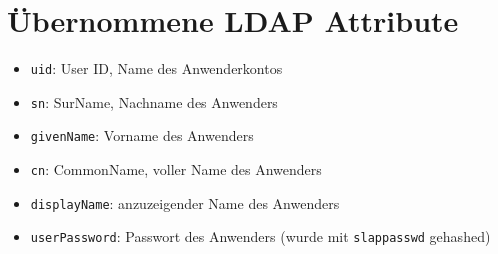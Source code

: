 \documentclass[11pt,a4paper,titlepage=firstiscover,headsepline,bibtotoc]{scrartcl} %
\begin{document}
%
%



\appendix
\newpage
{} %
\section{Übernommene LDAP Attribute} \label{sec:LDAP-Attribute}
\begin{itemize}
\item\texttt{uid}: User ID, Name des Anwenderkontos
\item\texttt{sn}: SurName, Nachname des Anwenders
\item\texttt{givenName}: Vorname des Anwenders
\item\texttt{cn}: CommonName, voller Name des Anwenders
\item\texttt{displayName}: anzuzeigender Name des Anwenders
\item\texttt{userPassword}: Passwort des Anwenders (wurde mit \texttt{slappasswd} gehashed)
\end{itemize}

\newpage
\end{document}
